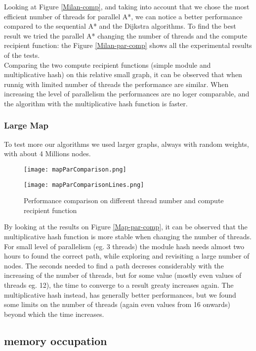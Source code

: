 Looking at Figure \ref{Milan-comp}, and taking into account that we chose the most efficient number of threads for parallel A*,
we can notice a better performance compared to the sequential A* and the Dijkstra algorithms. 
To find the best result we tried the parallel A* changing the number of threads and the compute recipient function:
the Figure \ref{Milan-par-comp} shows all the experimental results of the tests.
\\
Comparing the two compute recipient functions (simple module and multiplicative hash)
on this relative small graph, it can be observed that when runnig with limited number of threads the performance are similar.
When increasing the level of parallelism the performances are no loger comparable, and the algorithm with the multiplicative hash function is faster.


\subsubsection{Large Map}

To test more our algorithms we used larger graphs, always with random weights, with about 4 Millions nodes.

\begin{figure}
    \centering
    \texttt{[image: mapParComparison.png]}
    \label{Map-par-comp}
    
    \texttt{[image: mapParComparisonLines.png]}
    \label{Map-par-comp-lines}
    \caption{Performance comparison on different thread number and compute recipient function}
\end{figure}


By looking at the results on Figure \ref{Map-par-comp}, it can be observed that the multiplicative hash function is more stable when changing the number of threads.
For small level of parallelism (eg. 3 threads) the module hash needs almost two hours to found the correct path, while exploring and revisiting a large number of nodes.
The seconds needed to find a path decreses considerably with the increasing of the number of threads, but for some value (mostly even values of threads eg. 12), the time to converge to a result greaty increases again.
The multiplicative hash instead, has generally better performances, but we found some limits on the number of threads (again even values from 16 onwards) beyond which the time increases.


\subsection{memory occupation}

